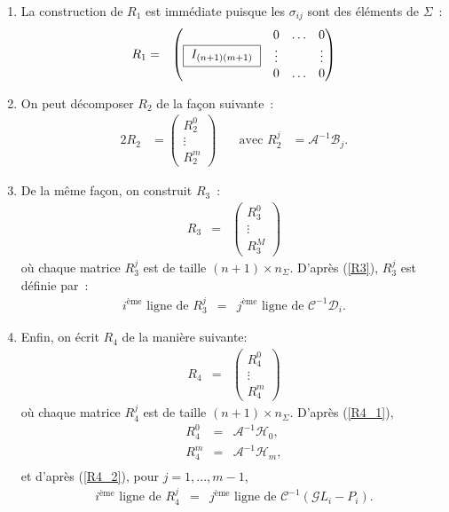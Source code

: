 \begin{enumerate}
\item La construction de $R_1$ est imm\'ediate puisque les 
$\sigma_{ij}$ sont des \'el\'ements de $\Sigma$~:
\begin{eqnarray*}
R_1 &=& \begin{pmatrix}
\framebox[2.2cm][c]{$I_{(n+1)(m+1)}$} & \begin{matrix} 0 
& \hdots & 0\\ \vdots && \vdots \\  0 & \hdots & 0 \end{matrix}
\end{pmatrix}
\end{eqnarray*}
\item On peut d\'ecomposer $R_2$ de la fa\c{c}on suivante~:
\begin{alignat*}{2}
R_2 &= \begin{pmatrix} R_2^0 \\ \vdots \\ R_2^m \end{pmatrix}
&\quad \text{avec  } R_2^j &= \mathcal{A}^{-1}\mathcal{B}_j.
\end{alignat*}
\item De la m\^eme fa\c{c}on, on construit $R_3$~:
\begin{eqnarray*}
R_3 &=& \begin{pmatrix} R_3^0 \\ \vdots \\ R_3^M \end{pmatrix}
\end{eqnarray*}
o\`u chaque matrice $R_3^j$ est de taille $(n+1)\times n_{\Sigma}$. 
D'apr\`es (\ref{R3}), $R_3^j$ est d\'efinie par~:
\begin{eqnarray*}
i^{\text{\`eme}}\text{ ligne de } R_3^j &=& j^{\text{\`eme}}
\text{ ligne de } \mathcal{C}^{-1}\mathcal{D}_i.
\end{eqnarray*}  
\item Enfin, on \'ecrit $R_4$ de la mani\`ere suivante:
\begin{eqnarray*}
R_4 &=& \begin{pmatrix} R_4^0 \\ \vdots \\ R_4^m \end{pmatrix}
\end{eqnarray*}
o\`u chaque matrice $R_4^j$ est de taille 
$(n+1)\times n_{\Sigma}$. D'apr\`es (\ref{R4_1}),
\begin{eqnarray*}
R_4^0 &=&  \mathcal{A}^{-1}\mathcal{H}_0,\\
R_4^m &=&  \mathcal{A}^{-1}\mathcal{H}_m,\\
\end{eqnarray*}
et d'apr\`es (\ref{R4_2}), pour $j=1,...,m-1$,
\begin{eqnarray*}
i^{\text{\`eme}}\text{ ligne de } R_4^j &=& j^{\text{\`eme}}
\text{ ligne de } \mathcal{C}^{-1}(\mathcal{G}L_i-P_i). 
\end{eqnarray*}
\end{enumerate}

